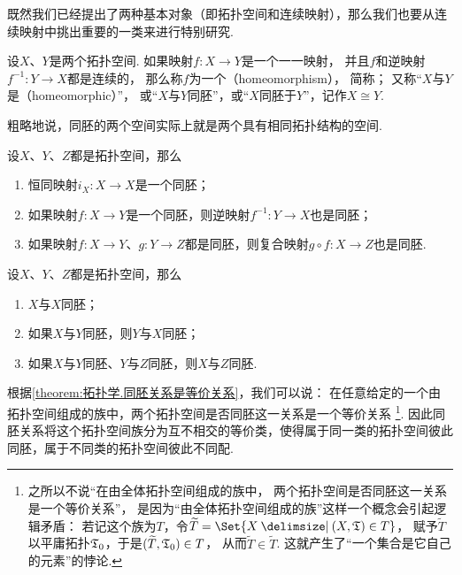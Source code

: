 既然我们已经提出了两种基本对象（即拓扑空间和连续映射），那么我们也要从连续映射中挑出重要的一类来进行特别研究.

\begin{definition}\label{definition:拓扑学.同胚映射的概念}
设\(X\)、\(Y\)是两个拓扑空间.
如果映射\(f\colon X \to Y\)是一个一一映射，
并且\(f\)和逆映射\(f^{-1}\colon Y \to X\)都是连续的，
那么称\(f\)为一个（homeomorphism），
简称；
又称“\(X\)与\(Y\)是（homeomorphic）”，
或“\(X\)与\(Y\)同胚”，或“\(X\)同胚于\(Y\)”，记作\(X \cong Y\).
\end{definition}

粗略地说，同胚的两个空间实际上就是两个具有相同拓扑结构的空间.

\begin{theorem}\label{theorem:拓扑学.同胚映射的性质}
设\(X\)、\(Y\)、\(Z\)都是拓扑空间，那么
\begin{enumerate}
\item 恒同映射\(i_X\colon X \to X\)是一个同胚；
\item 如果映射\(f\colon X \to Y\)是一个同胚，则逆映射\(f^{-1}\colon Y \to X\)也是同胚；
\item 如果映射\(f\colon X \to Y\)、\(g\colon Y \to Z\)都是同胚，则复合映射\(g \circ f\colon X \to Z\)也是同胚.
\end{enumerate}
\end{theorem}

\begin{theorem}\label{theorem:拓扑学.同胚关系是等价关系}
设\(X\)、\(Y\)、\(Z\)都是拓扑空间，那么
\begin{enumerate}
\item \(X\)与\(X\)同胚；
\item 如果\(X\)与\(Y\)同胚，则\(Y\)与\(X\)同胚；
\item 如果\(X\)与\(Y\)同胚、\(Y\)与\(Z\)同胚，则\(X\)与\(Z\)同胚.
\end{enumerate}
\end{theorem}
根据\cref{theorem:拓扑学.同胚关系是等价关系}，我们可以说：
在任意给定的一个由拓扑空间组成的族中，两个拓扑空间是否同胚这一关系是一个等价关系
\footnote{%
之所以不说“在由全体拓扑空间组成的族中，
两个拓扑空间是否同胚这一关系是一个等价关系”，
是因为“由全体拓扑空间组成的族”这样一个概念会引起逻辑矛盾：
若记这个族为\(T\)，令\(\widetilde{T} = \Set{ X \given (X,\T) \in T }\)，
赋予\(\widetilde{T}\)以平庸拓扑\(\mathfrak T_0\)，于是\((\widetilde{T},\mathfrak T_0) \in T\)，
从而\(\widetilde{T} \in \widetilde{T}\).
这就产生了“一个集合是它自己的元素”的悖论.
}.
因此同胚关系将这个拓扑空间族分为互不相交的等价类，使得属于同一类的拓扑空间彼此同胚，属于不同类的拓扑空间彼此不同配.

